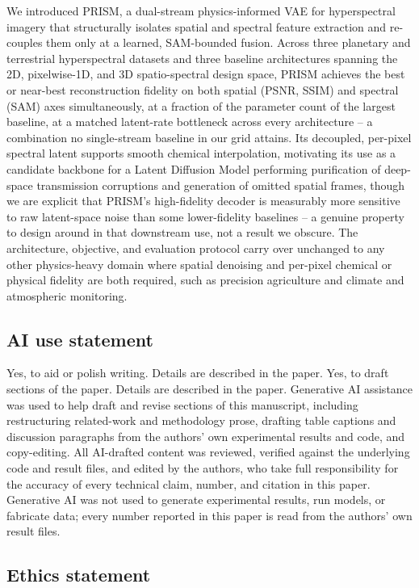 \documentclass{article} %
\begin{document}
We introduced PRISM, a dual-stream physics-informed VAE for hyperspectral imagery that structurally isolates spatial and spectral feature extraction and re-couples them only at a learned, SAM-bounded fusion. Across three planetary and terrestrial hyperspectral datasets and three baseline architectures spanning the 2D, pixelwise-1D, and 3D spatio-spectral design space, PRISM achieves the best or near-best reconstruction fidelity on both spatial (PSNR, SSIM) and spectral (SAM) axes simultaneously, at a fraction of the parameter count of the largest baseline, at a matched latent-rate bottleneck across every architecture -- a combination no single-stream baseline in our grid attains. Its decoupled, per-pixel spectral latent supports smooth chemical interpolation, motivating its use as a candidate backbone for a Latent Diffusion Model performing purification of deep-space transmission corruptions and generation of omitted spatial frames, though we are explicit that PRISM's high-fidelity decoder is measurably more sensitive to raw latent-space noise than some lower-fidelity baselines -- a genuine property to design around in that downstream use, not a result we obscure. The architecture, objective, and evaluation protocol carry over unchanged to any other physics-heavy domain where spatial denoising and per-pixel chemical or physical fidelity are both required, such as precision agriculture and climate and atmospheric monitoring.

\subsection*{AI use statement}

Yes, to aid or polish writing. Details are described in the paper. Yes, to draft sections of the paper. Details are described in the paper. Generative AI assistance was used to help draft and revise sections of this manuscript, including restructuring related-work and methodology prose, drafting table captions and discussion paragraphs from the authors' own experimental results and code, and copy-editing. All AI-drafted content was reviewed, verified against the underlying code and result files, and edited by the authors, who take full responsibility for the accuracy of every technical claim, number, and citation in this paper. Generative AI was not used to generate experimental results, run models, or fabricate data; every number reported in this paper is read from the authors' own result files.

\subsection*{Ethics statement}
\end{document}

